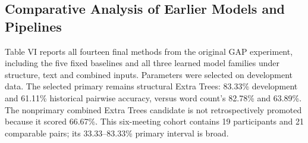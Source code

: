 \documentclass[journal]{IEEEtran}
\begin{document}
\subsection{Comparative Analysis of Earlier Models and Pipelines}
Table VI reports all fourteen final methods from the original GAP experiment, including the five fixed baselines and all three learned model families under structure, text and combined inputs. Parameters were selected on development data. The selected primary remains structural Extra Trees: 83.33\% development and 61.11\% historical pairwise accuracy, versus word count's 82.78\% and 63.89\%. The nonprimary combined Extra Trees candidate is not retrospectively promoted because it scored 66.67\%. This six-meeting cohort contains 19 participants and 21 comparable pairs; its 33.33--83.33\% primary interval is broad.
\end{document}
